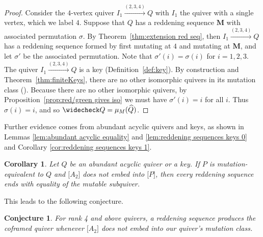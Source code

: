 \documentclass[11pt, letterpaper]{amsart}
\newtheorem{conjecture}[theorem]{Conjecture}
\newtheorem{corollary}[theorem]{Corollary}
\theoremstyle{definition}
\numberwithin{equation}{section}
\begin{document}
\begin{proof}
{    %
    Consider the $4$-vertex quiver $I_1 \stackrel{(2,3,4)}{\longrightarrow} Q$ with $I_1$ the quiver with a single vertex, which we label $4$.
    Suppose that $Q$ has a reddening sequence  $\mathbf{M}$ with associated permutation $\sigma$.
    By Theorem~\ref{thm:extension red seq}, then $I_1 \stackrel{(2,3,4)}{\longrightarrow} Q$ has a reddening sequence formed by first mutating at $4$ and mutating at $\mathbf{M}$, and let $\sigma'$ be the associated permutation.
    Note that $\sigma'(i)=\sigma(i)$ for $i=1,2,3$. 
    The quiver $I_1 \stackrel{(2,3,4)}{\longrightarrow} Q$ is a key (Definition~\ref{def:key}).
    By construction and Theorem~\ref{thm:finiteKeys}, there are no other isomorphic quivers in its mutation class (\cite{MR4695532}).
    Because there are no other isomorphic quivers, by Proposition~\ref{prop:red/green gives iso} we must have $\sigma'(i)=i$ for all $i$.
    Thus $\sigma(i)=i$, and so $\widecheck Q = \mu_M(\widehat Q)$.}
\end{proof}

Further evidence comes from abundant acyclic quivers and keys, as shown in Lemmas \ref{lem:abundant acyclic equality} and \ref{lem:reddening sequences keys 0} and Corollary \ref{cor:reddening sequences keys 1}.

\begin{corollary} \label{cor:red-seq-aa-keys}
    Let $Q$ be an abundant acyclic quiver or a key.
    If $P$ is mutation-equivalent to $Q$ and $\big [A_2 \big ]$ does not embed into $\big [ P \big ]$, then every reddening sequence ends with equality of the mutable subquiver.
\end{corollary}


This leads to the following conjecture.

\begin{conjecture}
\label{conj:A2s do all}
For rank 4 and above quivers, a reddening sequence produces the coframed quiver whenever $\big [A_2\big ]$ does not embed into our quiver's mutation class.
\end{conjecture}
\end{document}

